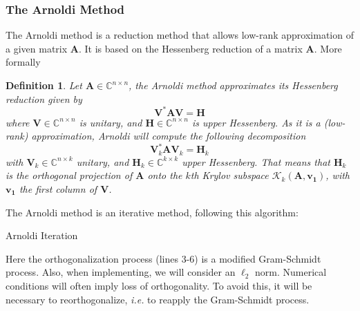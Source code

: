 \documentclass[11pt]{article}
\newtheorem{definition}{Definition}
\numberwithin{equation}{section}
\begin{document}
\subsubsection{The Arnoldi Method}
The Arnoldi method is a reduction method that allows low-rank approximation of a given matrix $\mathbf{A}$. It is based on the Hessenberg reduction of a matrix $\mathbf{A}$. More formally
\begin{definition}
    Let $\mathbf{A}\in\mathbb{C}^{n\times n}$, the Arnoldi method approximates its Hessenberg reduction given by
    \begin{equation}
        \mathbf{V}^*\mathbf{A}\mathbf{V} = \mathbf{H}
    \end{equation}
    where $\mathbf{V}\in\mathbb{C}^{n\times n}$ is unitary, and $\mathbf{H}\in\mathbb{C}^{n\times n}$ is upper Hessenberg. As it is a (low-rank) approximation, Arnoldi will compute the following decomposition
    \begin{equation}
        \mathbf{V}_k^*\mathbf{A}\mathbf{V}_k = \mathbf{H}_k
    \end{equation}
    with $\mathbf{V}_k\in\mathbb{C}^{n\times k}$ unitary, and $\mathbf{H}_k\in\mathbb{C}^{k\times k}$ upper Hessenberg. That means that $\mathbf{H}_k$ is the orthogonal projection of $\mathbf{A}$ onto the $k$th Krylov subspace $\mathcal{K}_k(\mathbf{A},\mathbf{v_1})$, with $\mathbf{v_1}$ the first column of $\mathbf{V}$.
\end{definition}
The Arnoldi method is an iterative method, following this algorithm:
\begin{algorithm2e}
    \SetAlgoLined
    \caption{Arnoldi Iteration}
    \label{alg:arnoldi}
\end{algorithm2e}

Here the orthogonalization process (lines 3-6) is a modified Gram-Schmidt process. Also, when implementing, we will consider an $\ell_2$ norm. Numerical conditions will often imply loss of orthogonality. To avoid this, it will be necessary to reorthogonalize, \textit{i.e.} to reapply the Gram-Schmidt process.
\end{document}
